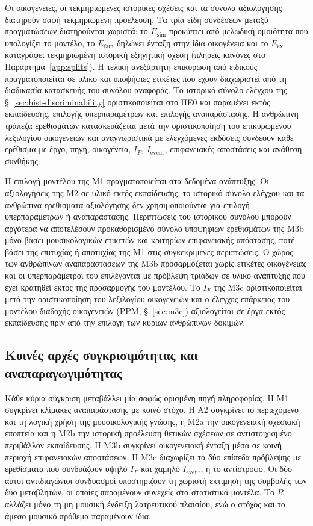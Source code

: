 \documentclass[11pt,a4paper]{article}
\begin{document}
Οι οικογένειες, οι τεκμηριωμένες ιστορικές σχέσεις και τα σύνολα αξιολόγησης διατηρούν σαφή τεκμηριωμένη προέλευση. Τα τρία είδη συνδέσεων μεταξύ πραγματώσεων διατηρούνται χωριστά: το $E_{\mathrm{sim}}$ προκύπτει από μελωδική ομοιότητα που υπολογίζει το μοντέλο, το $E_{\mathrm{fam}}$ δηλώνει ένταξη στην ίδια οικογένεια και το $E_{\mathrm{ex}}$ καταγράφει τεκμηριωμένη ιστορική εξηγητική σχέση (πλήρεις κανόνες στο Παράρτημα~\ref{app:splits}). Η τελική ανεξάρτητη επικύρωση από ειδικούς πραγματοποιείται σε υλικό και υποψήφιες ετικέτες που έχουν διαχωριστεί από τη διαδικασία κατασκευής του συνόλου αναφοράς. Το ιστορικό σύνολο ελέγχου της §~\ref{sec:hist-discriminability} οριστικοποιείται στο ΠΕ0 και παραμένει εκτός εκπαίδευσης, επιλογής υπερπαραμέτρων και επιλογής αναπαράστασης. Η ανθρώπινη τράπεζα ερεθισμάτων κατασκευάζεται μετά την οριστικοποίηση του επικυρωμένου λεξιλογίου οικογενειών και αναγνωριστικά με ελεγχόμενες εκδόσεις συνδέουν κάθε ερέθισμα με έργο, πηγή, οικογένεια, $I_F$, $I_{\mathrm{event}}$, επιφανειακές αποστάσεις και ανάθεση συνθήκης.

Η επιλογή μοντέλου της M1 πραγματοποιείται στα δεδομένα ανάπτυξης. Οι αξιολογήσεις της M2 σε υλικό εκτός εκπαίδευσης, το ιστορικό σύνολο ελέγχου και τα ανθρώπινα ερεθίσματα αξιολόγησης δεν χρησιμοποιούνται για επιλογή υπερπαραμέτρων ή αναπαράστασης. Περιπτώσεις του ιστορικού συνόλου μπορούν αργότερα να αποτελέσουν προκαθορισμένο σύνολο υποψήφιων ερεθισμάτων της M3b μόνο βάσει μουσικολογικών ετικετών και κριτηρίων επιφανειακής απόστασης, ποτέ βάσει της επιτυχίας ή αποτυχίας της M1 στις συγκεκριμένες περιπτώσεις. Ο χώρος των ανθρώπινων αναπαραστάσεων της M3b προσαρμόζεται χωρίς ετικέτες οικογένειας και οι υπερπαράμετροί του επιλέγονται με πρόβλεψη τριάδων σε υλικό ανάπτυξης που έχει κρατηθεί εκτός της προσαρμογής του μοντέλου. Το $I_F$ της M3c οριστικοποιείται μετά την οριστικοποίηση του λεξιλογίου οικογενειών και ο έλεγχος επάρκειας του μοντέλου διαδοχής οικογενειών (PPM, §~\ref{sec:m3c}) αξιολογείται σε έργα εκτός εκπαίδευσης πριν από την επιλογή των κύριων ανθρώπινων δοκιμών.

\subsection{Κοινές αρχές συγκρισιμότητας και αναπαραγωγιμότητας}

Κάθε κύρια σύγκριση μεταβάλλει μία σαφώς ορισμένη πηγή πληροφορίας. Η M1 συγκρίνει κλίμακες αναπαράστασης με κοινό στόχο. Η Α2 συγκρίνει το περιεχόμενο και τη λογική χρήση της μουσικολογικής γνώσης, η Μ2a την οικογενειακή σχεσιακή εποπτεία και η Μ2b την ιστορική προέλευση θετικών σχέσεων σε αντιστοιχισμένο περιβάλλον εκπαίδευσης. Η M3b συγκρίνει οικογενειακή ένταξη μέσα σε κοινή περιοχή επιφανειακών αποστάσεων. Η M3c διαχωρίζει τα δύο επίπεδα πρόβλεψης με ερεθίσματα που συνδυάζουν υψηλό $I_F$ και χαμηλό $I_{\mathrm{event}}$, ή το αντίστροφο. Οι δύο αυτοί αντιδιαγώνιοι συνδυασμοί υποστηρίζουν τη χωριστή εκτίμηση της συμβολής των δύο μεταβλητών, οι οποίες παραμένουν συνεχείς στα στατιστικά μοντέλα. Το $R$ αλλάζει μόνο τη μη μουσική ένδειξη λατρευτικού πλαισίου, ενώ ο στόχος και το άμεσο μουσικό πρόθεμα παραμένουν ίδια.
\end{document}
